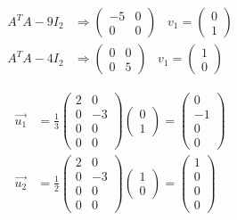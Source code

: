 \begin{align}
    A^T A - 9 I_2 &\Rightarrow \begin{pmatrix}
        -5 & 0 \\ 0 & 0
    \end{pmatrix} \;\;\; v_1 = \begin{pmatrix}
        0 \\ 1
    \end{pmatrix} \\
    A^T A - 4 I_2 &\Rightarrow \begin{pmatrix}
        0 & 0 \\ 0 & 5
    \end{pmatrix} \;\;\; v_1 = \begin{pmatrix}
        1 \\ 0
    \end{pmatrix}
\end{align}

\begin{align}
    \Vec{u_1} &= \frac{1}{3} \begin{pmatrix}
        2 & 0 \\ 0 & -3 \\ 0 & 0 \\ 0 & 0
    \end{pmatrix} \begin{pmatrix}
        0 \\ 1
    \end{pmatrix} = \begin{pmatrix}
        0 \\ -1 \\ 0 \\ 0
    \end{pmatrix} \\
    \Vec{u_2} &= \frac{1}{2} \begin{pmatrix}
        2 & 0 \\ 0 & -3 \\ 0 & 0 \\ 0 & 0
    \end{pmatrix} \begin{pmatrix}
        1 \\ 0
    \end{pmatrix} = \begin{pmatrix}
        1 \\ 0 \\ 0 \\ 0
    \end{pmatrix}
\end{align}

